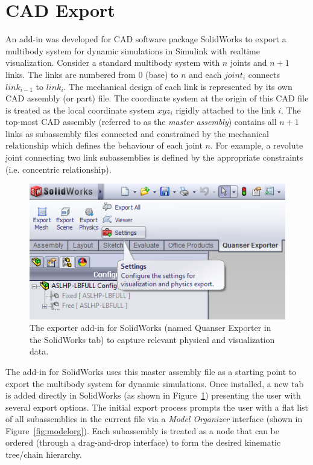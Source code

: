 \section{CAD Export} %
\label{sec:cad_export}

An add-in was developed for CAD software package SolidWorks to export a multibody system for dynamic simulations in Simulink with realtime visualization. Consider a standard multibody system with $n$ joints and $n + 1$ links. The links are numbered from 0 (base) to $n$ and each $joint_{i}$ connects $link_{i-1}$ to $link_{i}$. The mechanical design of each link is represented by its own CAD assembly (or part) file. The coordinate system at the origin of this CAD file is treated as the local coordinate system $xyz_{i}$ rigidly attached to the link $i$. The top-most CAD assembly (referred to as the \emph{master assembly}) contains all $n + 1$ links as subassembly files connected and constrained by the mechanical relationship which defines the behaviour of each joint $n$. For example, a revolute joint connecting two link subassemblies is defined by the appropriate constraints (i.e. concentric relationship).

\begin{figure}[!h]
	\centering
    \includegraphics[scale=1.0]{fig/toolchain/exporter.png}
  	\caption{The exporter add-in for SolidWorks (named Quanser Exporter in the SolidWorks tab) to capture relevant physical and visualization data.}
	\label{fig:swexporter}
\end{figure}

The add-in for SolidWorks uses this master assembly file as a starting point to export the multibody system for dynamic simulations. Once installed, a new tab is added directly in SolidWorks (as shown in Figure~\ref{fig:swexporter}) presenting the user with several export options. The initial export process prompts the user with a flat list of all subassemblies in the current file via a \emph{Model Organizer} interface (shown in Figure~\ref{fig:modelorg}). Each subassembly is treated as a node that can be ordered (through a drag-and-drop interface) to form the desired kinematic tree/chain hierarchy. 



